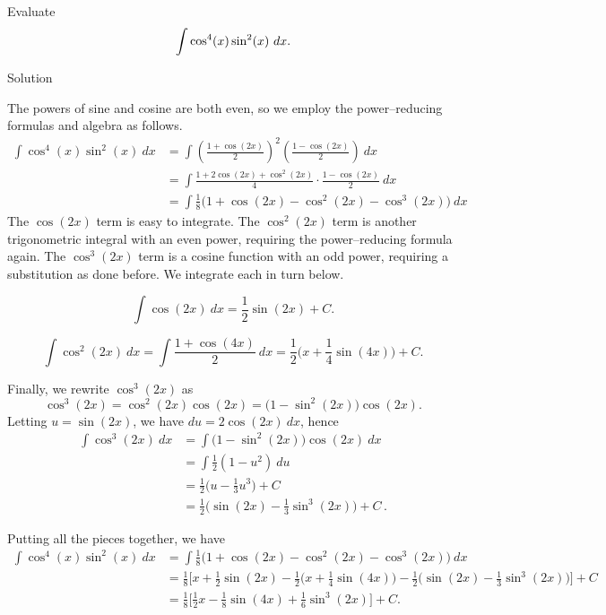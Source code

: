 \pagebreak
\begin{example}\label{ex_trigint3}
Evaluate $$\displaystyle\int\cos^4(x)\sin^2(x)\ dx.$$

Solution 

The powers of sine and cosine are both even, so we employ the power--reducing formulas and algebra as follows.
\begin{align*}
\int \cos^4(x)\sin^2(x)\ dx &= \int\left(\frac{1+\cos(2x)}{2}\right)^2\left(\frac{1-\cos(2x)}2\right)\ dx \\[0.2cm]
				&= \int\frac{1+2\cos(2x)+\cos^2(2x)}4\cdot\frac{1-\cos(2x)}2\ dx\\[0.2cm]
				&=	\int \frac18\big(1+\cos(2x)-\cos^2(2x)-\cos^3(2x)\big)\ dx
\end{align*}
The $\cos(2x)$ term is easy to integrate. The $\cos^2(2x)$ term is another trigonometric integral with an even power, requiring the power--reducing formula again. The $\cos^3(2x)$ term is a cosine function with an odd power, requiring a substitution as done before. We integrate each in turn below.

$$\int\cos(2x)\ dx = \frac12\sin(2x)+C.$$

$$\int\cos^2(2x)\ dx = \int \frac{1+\cos(4x)}2\ dx = \frac12\Big( x+\frac14\sin(4x)\Big)+C.$$

Finally, we rewrite $\cos^3(2x)$ as $$\cos^3(2x) = \cos^2(2x)\cos(2x) = \big(1-\sin^2(2x)\big)\cos(2x).$$
Letting $u=\sin(2x)$, we have $du = 2\cos(2x)\ dx$, hence
\begin{align*}
\int \cos^3(2x)\ dx &= \int\big(1-\sin^2(2x)\big)\cos(2x)\ dx\\[0.2cm]
							&= \int \frac12(1-u^2)\ du\\[0.2cm]
							&= \frac12\Big(u-\frac13u^3\Big)+C\\[0.2cm]
							&=	\frac12\Big(\sin(2x)-\frac13\sin^3(2x)\Big)+C\,.
\end{align*}

Putting all the pieces together, we have
\begin{align*}
\int \cos^4(x)\sin^2(x)\ dx &=\int \frac18\big(1+\cos(2x)-\cos^2(2x)-\cos^3(2x)\big)\ dx \\[0.2cm]
					&= \frac18\Big[x+\frac12\sin(2x)-\frac12\Big(x+\frac14\sin(4x)\Big)-\frac12\Big(\sin(2x)-\frac13\sin^3(2x)\Big)\Big]+C \\[0.2cm]
					&=\frac18\Big[\frac12x-\frac18\sin(4x)+\frac16\sin^3(2x)\Big]+C.
\end{align*}
\end{example}

